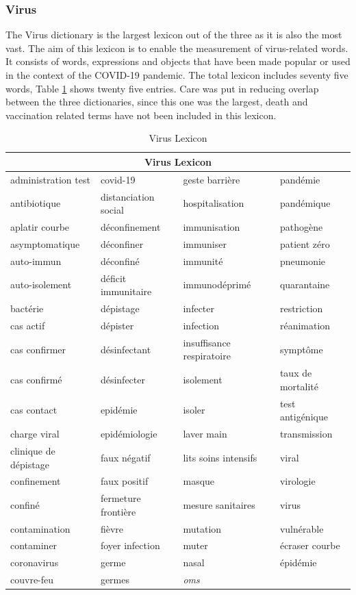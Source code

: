 \subsubsection{Virus}

The Virus dictionary is the largest lexicon out of the three as it is also the most vast. The aim of this lexicon is to enable the measurement of virus-related words. It consists of words, expressions and objects that have been made popular or used in the context of the COVID-19 pandemic. The total lexicon includes seventy five words, Table \ref{tab:virus lexicon} shows twenty five entries. Care was put in reducing overlap between the three dictionaries, since this one was the largest, death and vaccination related terms have not been included in this lexicon.


\begin{table}[H]
\centering
\begin{tabular}{@{}llll@{}}
\toprule
\multicolumn{4}{c}{\textbf{Virus Lexicon}} \\ \midrule
administration test & covid-19 & geste barrière & pandémie \\
antibiotique & distanciation social & hospitalisation & pandémique \\
aplatir courbe & déconfinement & immunisation & pathogène \\
asymptomatique & déconfiner & immuniser & patient zéro \\
auto-immun & déconfiné & immunité & pneumonie \\
auto-isolement & déficit immunitaire & immunodéprimé & quarantaine \\
bactérie & dépistage & infecter & restriction \\
cas actif & dépister & infection & réanimation \\
cas confirmer & désinfectant & insuffisance respiratoire & symptôme \\
cas confirmé & désinfecter & isolement & taux de mortalité \\
cas contact & epidémie & isoler & test antigénique \\
charge viral & epidémiologie & laver main & transmission \\
clinique de dépistage & faux négatif & lits soins intensifs & viral \\
confinement & faux positif & masque & virologie \\
confiné & fermeture frontière & mesure sanitaires & virus \\
contamination & fièvre & mutation & vulnérable \\
contaminer & foyer infection & muter & écraser courbe \\
coronavirus & germe & nasal & épidémie \\
couvre-feu & germes & \textit{oms} & \\
\bottomrule
\end{tabular}
\caption{Virus Lexicon}
\label{tab:virus lexicon}
\end{table}

